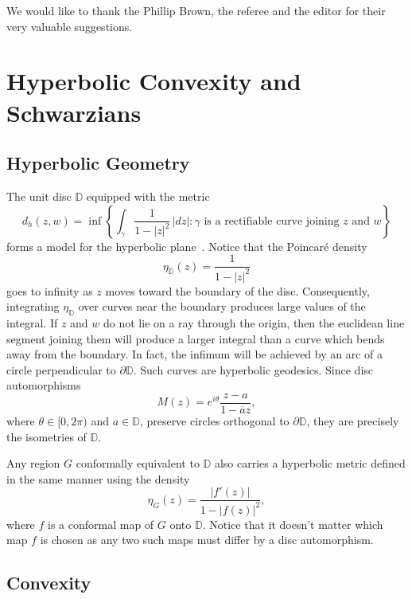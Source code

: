 \documentclass{lms}
\newcommand{\D}{\mathbb D}
\newcommand{\abs}[1]{\lvert#1\rvert}
\numberwithin{equation}{section}
\begin{document}
We would like to thank the Phillip Brown, the referee and the editor for their 
very valuable suggestions.



\section{Hyperbolic Convexity and Schwarzians}\label{S:hypercon}

\subsection{Hyperbolic Geometry}

The unit disc $\D$ equipped with the metric
\[
d_h (z,w)=\inf
\left\{\int_\gamma \frac{1}{1-\abs{z}^2}\,\abs{dz} : \gamma 
\text{ is a rectifiable curve joining $z$ and $w$}\right\}
\]
forms a model for the hyperbolic plane~\cite{aB83}.  
Notice that the Poincar\'e
density 
\[
\eta_\D(z)=\frac{1}{1-\abs{z}^2}
\]
goes to infinity as $z$ moves toward the boundary of the disc.
Consequently, integrating $\eta_\D$ over curves near the boundary
produces large values of the integral.  If $z$ and $w$ do not lie on
a ray through the origin, then the euclidean line segment
joining them will produce a larger integral than a curve which bends 
away from the boundary.  In fact, the infimum  will be achieved by
an arc of a circle perpendicular to $\partial \D$.  Such curves are
hyperbolic geodesics.
Since disc automorphisms  
\[
M(z)=e^{i\theta}\frac{z-a}{1-\overline{a}z},
\]
where $\theta\in[0,2\pi)$ and $a\in\D$,
preserve circles 
orthogonal to $\partial \D$,
they are precisely the isometries of $\D$.

Any region $G$ conformally equivalent to $\D$ also carries a hyperbolic metric
defined in the same manner using  the density
\[
\eta_G(z)=\frac{\abs{f'(z)}}{1-\abs{f(z)}^2},
\]
where $f$ is a conformal map of $G$ onto $\D$.  Notice that it doesn't
matter which map $f$ is chosen as any two such maps must differ by a
disc automorphism.


\subsection{Convexity}
\end{document}
